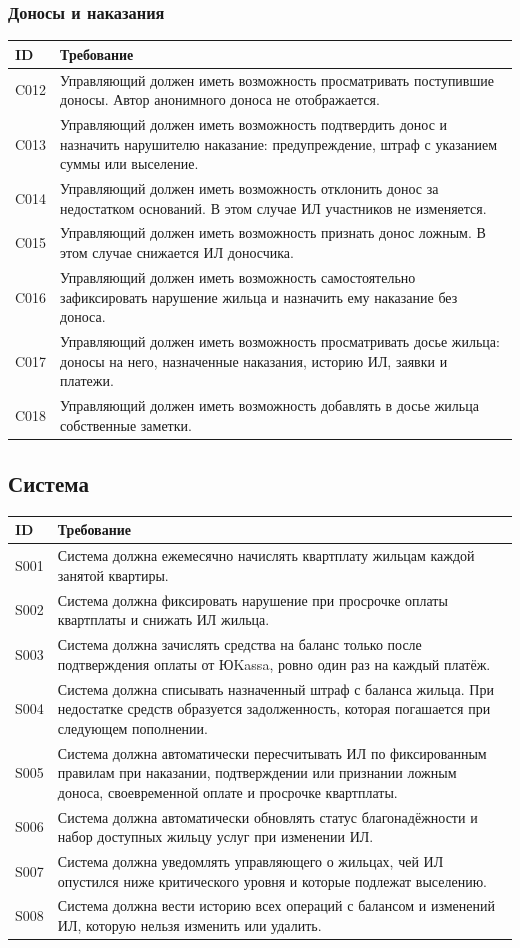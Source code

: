 \documentclass[12pt,a4paper]{article}
\newenvironment{reqtable}{%
  \begin{longtable}{L{14mm} L{146mm}}
  \toprule
  \textbf{ID} & \textbf{Требование} \\
  \midrule
  \endhead
  \bottomrule
  \endfoot
}{\end{longtable}}
\begin{document}
\subsubsection*{Доносы и наказания}
\begin{reqtable}
C012 & Управляющий должен иметь возможность просматривать поступившие доносы. Автор анонимного доноса не отображается. \\
C013 & Управляющий должен иметь возможность подтвердить донос и назначить нарушителю наказание: предупреждение, штраф с указанием суммы или выселение. \\
C014 & Управляющий должен иметь возможность отклонить донос за недостатком оснований. В этом случае ИЛ участников не изменяется. \\
C015 & Управляющий должен иметь возможность признать донос ложным. В этом случае снижается ИЛ доносчика. \\
C016 & Управляющий должен иметь возможность самостоятельно зафиксировать нарушение жильца и назначить ему наказание без доноса. \\
C017 & Управляющий должен иметь возможность просматривать досье жильца: доносы на него, назначенные наказания, историю ИЛ, заявки и платежи. \\
C018 & Управляющий должен иметь возможность добавлять в досье жильца собственные заметки. \\
\end{reqtable}

\subsection{Система}
\begin{reqtable}
S001 & Система должна ежемесячно начислять квартплату жильцам каждой занятой квартиры. \\
S002 & Система должна фиксировать нарушение при просрочке оплаты квартплаты и снижать ИЛ жильца. \\
S003 & Система должна зачислять средства на баланс только после подтверждения оплаты от ЮKassa, ровно один раз на каждый платёж. \\
S004 & Система должна списывать назначенный штраф с баланса жильца. При недостатке средств образуется задолженность, которая погашается при следующем пополнении. \\
S005 & Система должна автоматически пересчитывать ИЛ по фиксированным правилам при наказании, подтверждении или признании ложным доноса, своевременной оплате и просрочке квартплаты. \\
S006 & Система должна автоматически обновлять статус благонадёжности и набор доступных жильцу услуг при изменении ИЛ. \\
S007 & Система должна уведомлять управляющего о жильцах, чей ИЛ опустился ниже критического уровня и которые подлежат выселению. \\
S008 & Система должна вести историю всех операций с балансом и изменений ИЛ, которую нельзя изменить или удалить. \\
\end{reqtable}
\end{document}
